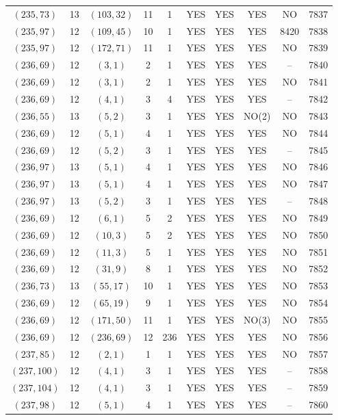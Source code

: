 \begin{longtable}{|c|c|c|c|c|c|c|c|c|c|}
$(235, 73)$ & 13 & $(103, 32)$ & 11 & 1 & YES & YES & YES & NO & 7837\\
$(235, 97)$ & 12 & $(109, 45)$ & 10 & 1 & YES & YES & YES & 8420 & 7838\\
$(235, 97)$ & 12 & $(172, 71)$ & 11 & 1 & YES & YES & YES & NO & 7839\\
$(236, 69)$ & 12 & $(3, 1)$ & 2 & 1 & YES & YES & YES & -- & 7840\\
$(236, 69)$ & 12 & $(3, 1)$ & 2 & 1 & YES & YES & YES & NO & 7841\\
$(236, 69)$ & 12 & $(4, 1)$ & 3 & 4 & YES & YES & YES & -- & 7842\\
$(236, 55)$ & 13 & $(5, 2)$ & 3 & 1 & YES & YES & NO(2) & NO & 7843\\
$(236, 69)$ & 12 & $(5, 1)$ & 4 & 1 & YES & YES & YES & NO & 7844\\
$(236, 69)$ & 12 & $(5, 2)$ & 3 & 1 & YES & YES & YES & -- & 7845\\
$(236, 97)$ & 13 & $(5, 1)$ & 4 & 1 & YES & YES & YES & NO & 7846\\
$(236, 97)$ & 13 & $(5, 1)$ & 4 & 1 & YES & YES & YES & NO & 7847\\
$(236, 97)$ & 13 & $(5, 2)$ & 3 & 1 & YES & YES & YES & -- & 7848\\
$(236, 69)$ & 12 & $(6, 1)$ & 5 & 2 & YES & YES & YES & NO & 7849\\
$(236, 69)$ & 12 & $(10, 3)$ & 5 & 2 & YES & YES & YES & NO & 7850\\
$(236, 69)$ & 12 & $(11, 3)$ & 5 & 1 & YES & YES & YES & NO & 7851\\
$(236, 69)$ & 12 & $(31, 9)$ & 8 & 1 & YES & YES & YES & NO & 7852\\
$(236, 73)$ & 13 & $(55, 17)$ & 10 & 1 & YES & YES & YES & NO & 7853\\
$(236, 69)$ & 12 & $(65, 19)$ & 9 & 1 & YES & YES & YES & NO & 7854\\
$(236, 69)$ & 12 & $(171, 50)$ & 11 & 1 & YES & YES & NO(3) & NO & 7855\\
$(236, 69)$ & 12 & $(236, 69)$ & 12 & 236 & YES & YES & YES & NO & 7856\\
$(237, 85)$ & 12 & $(2, 1)$ & 1 & 1 & YES & YES & YES & NO & 7857\\
$(237, 100)$ & 12 & $(4, 1)$ & 3 & 1 & YES & YES & YES & -- & 7858\\
$(237, 104)$ & 12 & $(4, 1)$ & 3 & 1 & YES & YES & YES & -- & 7859\\
$(237, 98)$ & 12 & $(5, 1)$ & 4 & 1 & YES & YES & YES & -- & 7860\\

\end{longtable}
